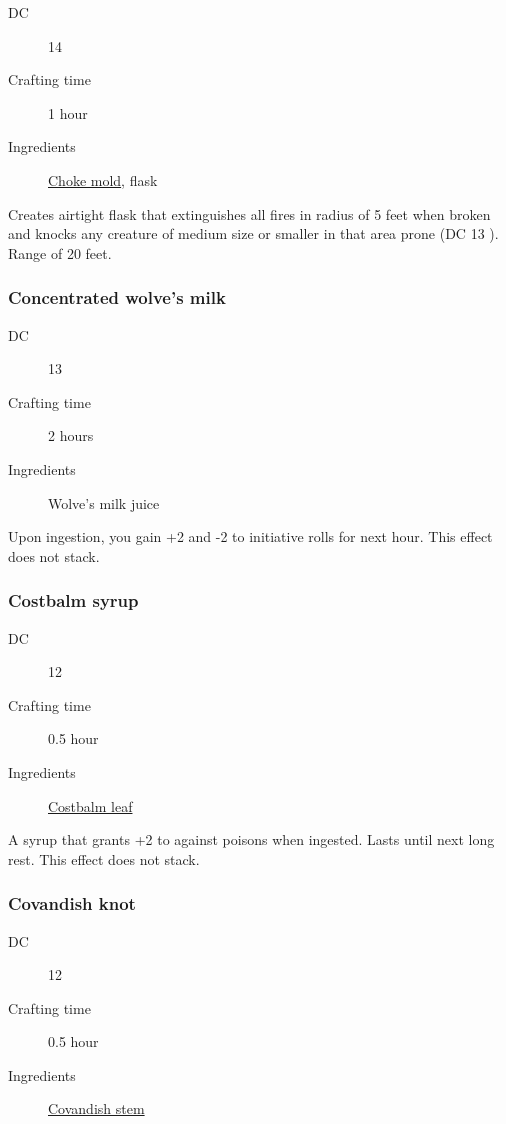 \begin{description}
\item [DC] 14 \nature
\item [Crafting time] 1 hour
\item [Ingredients] \hyperref[Choke Mold]{Choke mold}, flask
\end{description}

Creates airtight flask that extinguishes all fires in radius of 5 feet when broken and knocks any creature of medium size or smaller in that area prone (DC 13 \strengthsave). Range of 20 feet.

\subsubsection{Concentrated wolve's milk}

\begin{description}
\item [DC] 13 \survival
\item [Crafting time] 2 hours
\item [Ingredients] Wolve's milk juice
\end{description}

Upon ingestion, you gain +2 \constitution and -2 to initiative rolls for next hour. This effect does not stack.

\subsubsection{Costbalm syrup}
\label{Costbalm syrup}

\begin{description}
\item [DC] 12 \medicine
\item [Crafting time] 0.5 hour
\item [Ingredients] \hyperref[Cotsbalm]{Costbalm leaf}
\end{description}

A syrup that grants +2 to \constitutionsave against poisons when ingested. Lasts until next long rest.
This effect does not stack.

\subsubsection{Covandish knot}
\label{Covandish knot}

\begin{description}
\item [DC] 12 \arcana
\item [Crafting time] 0.5 hour
\item [Ingredients] \hyperref[Covadish]{Covandish stem}
\end{description}

